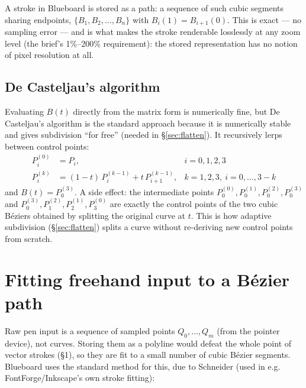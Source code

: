 \documentclass[11pt]{article}
\begin{document}
A stroke in Blueboard is stored as a path: a sequence of such cubic segments sharing
endpoints, $\{B_1, B_2, \dots, B_n\}$ with $B_i(1) = B_{i+1}(0)$. This is exact —
no sampling error — and is what makes the stroke renderable losslessly at any zoom level
(the brief's 1\%--200\% requirement): the stored representation has no notion of pixel
resolution at all.

\subsection{De Casteljau's algorithm}
Evaluating $B(t)$ directly from the matrix form is numerically fine, but De Casteljau's
algorithm is the standard approach because it is numerically stable and gives subdivision
``for free'' (needed in \S\ref{sec:flatten}). It recursively lerps between control points:
\begin{align}
  P_i^{(0)} &= P_i, & i = 0,1,2,3 \\
  P_i^{(k)} &= (1-t)\,P_i^{(k-1)} + t\,P_{i+1}^{(k-1)}, & k = 1,2,3,\ i = 0,\dots,3-k
\end{align}
and $B(t) = P_0^{(3)}$. A side effect: the intermediate points
$P_0^{(0)}, P_0^{(1)}, P_0^{(2)}, P_0^{(3)}$ and
$P_0^{(3)}, P_1^{(2)}, P_2^{(1)}, P_3^{(0)}$ are exactly the control points of the two
cubic Béziers obtained by splitting the original curve at $t$. This is how adaptive
subdivision (\S\ref{sec:flatten}) splits a curve without re-deriving new control points
from scratch.

\section{Fitting freehand input to a Bézier path}

Raw pen input is a sequence of sampled points $Q_0, \dots, Q_m$ (from the pointer device),
not curves. Storing them as a polyline would defeat the whole point of vector strokes
(\S1), so they are fit to a small number of cubic Bézier segments. Blueboard uses the
standard method for this, due to Schneider (used in e.g. FontForge/Inkscape's own stroke
fitting):
\end{document}

